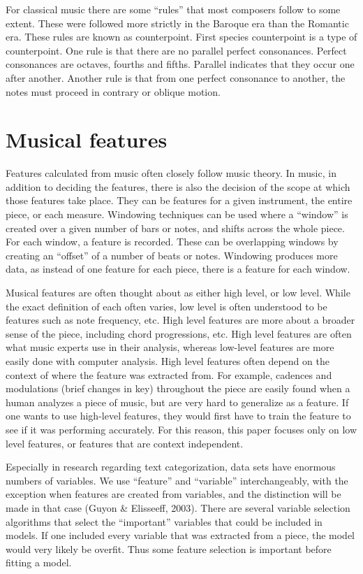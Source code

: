 \documentclass[12pt,twoside]{reedthesis}
\theoremstyle{definition}
\theoremstyle{definition}
\theoremstyle{definition}
\theoremstyle{remark}
\begin{document}
For classical music there are some ``rules'' that most composers follow
to some extent. These were followed more strictly in the Baroque era
than the Romantic era. These rules are known as counterpoint. First
species counterpoint is a type of counterpoint. One rule is that there
are no parallel perfect consonances. Perfect consonances are octaves,
fourths and fifths. Parallel indicates that they occur one after
another. Another rule is that from one perfect consonance to another,
the notes must proceed in contrary or oblique motion.

\section{Musical features}\label{musical-features}

Features calculated from music often closely follow music theory. In
music, in addition to deciding the features, there is also the decision
of the scope at which those features take place. They can be features
for a given instrument, the entire piece, or each measure. Windowing
techniques can be used where a ``window'' is created over a given number
of bars or notes, and shifts across the whole piece. For each window, a
feature is recorded. These can be overlapping windows by creating an
``offset'' of a number of beats or notes. Windowing produces more data,
as instead of one feature for each piece, there is a feature for each
window.

Musical features are often thought about as either high level, or low
level. While the exact definition of each often varies, low level is
often understood to be features such as note frequency, etc. High level
features are more about a broader sense of the piece, including chord
progressions, etc. High level features are often what music experts use
in their analysis, whereas low-level features are more easily done with
computer analysis. High level features often depend on the context of
where the feature was extracted from. For example, cadences and
modulations (brief changes in key) throughout the piece are easily found
when a human analyzes a piece of music, but are very hard to generalize
as a feature. If one wants to use high-level features, they would first
have to train the feature to see if it was performing accurately. For
this reason, this paper focuses only on low level features, or features
that are context independent.

Especially in research regarding text categorization, data sets have
enormous numbers of variables. We use ``feature'' and ``variable''
interchangeably, with the exception when features are created from
variables, and the distinction will be made in that case (Guyon \&
Elisseeff, 2003). There are several variable selection algorithms that
select the ``important'' variables that could be included in models. If
one included every variable that was extracted from a piece, the model
would very likely be overfit. Thus some feature selection is important
before fitting a model.
\end{document}
